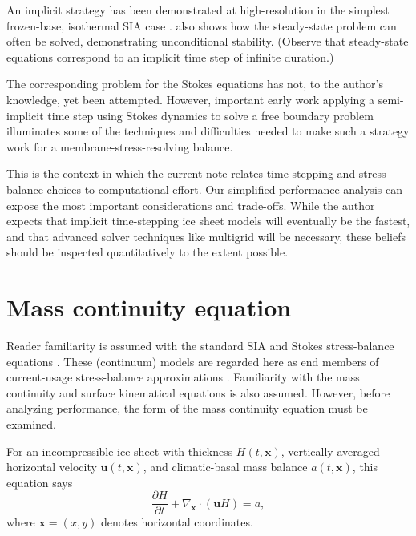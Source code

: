\documentclass[twocolumn,letterpaper]{igs}
\newcommand\bu{\mathbf{u}}
\newcommand\bx{\mathbf{x}}
\newcommand{\Divx}{\nabla_\bx \cdot}
\begin{document}
An implicit strategy has been demonstrated at high-resolution in the simplest frozen-base, isothermal SIA case \citep{Bueler2016,JouvetGraeser2013}.  \cite{Bueler2016} also shows how the steady-state problem \citep{JouvetBueler2012} can often be solved, demonstrating unconditional stability.  (Observe that steady-state equations correspond to an implicit time step of infinite duration.)

The corresponding problem for the Stokes equations has not, to the author's knowledge, yet been attempted.  However, important early work applying a semi-implicit time step using Stokes dynamics \citep{WirbelJarosch2020} to solve a free boundary problem illuminates some of the techniques and difficulties needed to make such a strategy work for a membrane-stress-resolving balance.

This is the context in which the current note relates time-stepping and stress-balance choices to computational effort.  Our simplified performance analysis can expose the most important considerations and trade-offs.  While the author expects that implicit time-stepping ice sheet models will eventually be the fastest, and that advanced solver techniques like multigrid \citep{Briggsetal2000} will be necessary, these beliefs should be inspected quantitatively to the extent possible.


\section{Mass continuity equation}

Reader familiarity is assumed with the standard SIA and Stokes stress-balance equations \citep{GreveBlatter2009,SchoofHewitt2013}.  These (continuum) models are regarded here as end members of current-usage stress-balance approximations \citep{Robinsonetal2022}.  Familiarity with the mass continuity and surface kinematical equations \citep{GreveBlatter2009} is also assumed.  However, before analyzing performance, the form of the mass continuity equation must be examined.

For an incompressible ice sheet with thickness $H(t,\bx)$, vertically-averaged horizontal velocity $\bu(t,\bx)$, and climatic-basal mass balance $a(t,\bx)$, this equation says
\begin{equation}
\frac{\partial H}{\partial t} + \Divx \left(\bu H\right) = a, \label{eq:masscontinuity}
\end{equation}
where $\bx=(x,y)$ denotes horizontal coordinates.
\end{document}
